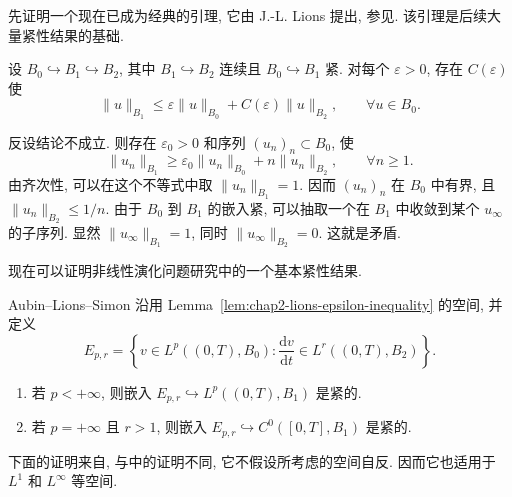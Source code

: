 先证明一个现在已成为经典的引理, 它由 J.-L. Lions 提出, 参见. 该引理是后续大量紧性结果的基础.

\begin{Lemma}
\label{lem:chap2-lions-epsilon-inequality}
设 $B_0\hookrightarrow B_1\hookrightarrow B_2$, 其中 $B_1\hookrightarrow B_2$ 连续且 $B_0\hookrightarrow B_1$ 紧. 对每个 $\varepsilon>0$, 存在 $C(\varepsilon)$ 使
\[
 \|u\|_{B_1}\leq\varepsilon\|u\|_{B_0}+C(\varepsilon)\|u\|_{B_2},
 \qquad\forall u\in B_0.
\]
\end{Lemma}

\begin{Proof}
反设结论不成立. 则存在 $\varepsilon_0>0$ 和序列 $(u_n)_n\subset B_0$, 使
\[
 \|u_n\|_{B_1}\geq\varepsilon_0\|u_n\|_{B_0}+n\|u_n\|_{B_2},
 \qquad\forall n\geq1.
\]
由齐次性, 可以在这个不等式中取 $\|u_n\|_{B_1}=1$. 因而 $(u_n)_n$ 在 $B_0$ 中有界, 且 $\|u_n\|_{B_2}\leq1/n$. 由于 $B_0$ 到 $B_1$ 的嵌入紧, 可以抽取一个在 $B_1$ 中收敛到某个 $u_\infty$ 的子序列. 显然 $\|u_\infty\|_{B_1}=1$, 同时 $\|u_\infty\|_{B_2}=0$. 这就是矛盾.
\end{Proof}

现在可以证明非线性演化问题研究中的一个基本紧性结果.

\begin{Theorem}{Aubin--Lions--Simon}
\label{thm:chap2-aubin-lions-simon}
沿用 Lemma~\ref{lem:chap2-lions-epsilon-inequality} 的空间, 并定义
\[
 E_{p,r}=\left\{v\in L^p((0,T),B_0):\frac{\mathrm{d}v}{\mathrm{d}t}\in L^r((0,T),B_2)\right\}.
\]
\begin{enumerate}
 \item 若 $p<+\infty$, 则嵌入 $E_{p,r}\hookrightarrow L^p((0,T),B_1)$ 是紧的.
 \item 若 $p=+\infty$ 且 $r>1$, 则嵌入 $E_{p,r}\hookrightarrow C^0([0,T],B_1)$ 是紧的.
\end{enumerate}
\end{Theorem}

下面的证明来自, 与中的证明不同, 它不假设所考虑的空间自反. 因而它也适用于 $L^1$ 和 $L^\infty$ 等空间.

